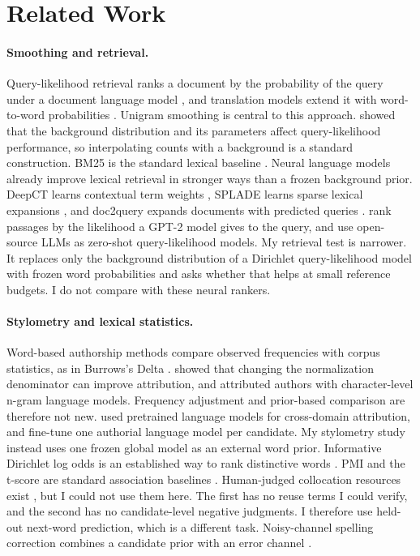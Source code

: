 \documentclass[11pt]{article}
\begin{document}
\section{Related Work}

\paragraph{Smoothing and retrieval.} Query-likelihood retrieval ranks a
document by the probability of the query under a document language model
\citep{pontecroft1998}, and translation models extend it with word-to-word
probabilities \citep{bergerlafferty1999}. Unigram smoothing is central to this
approach. \citet{zhai2004smoothing} showed that the background
distribution and its parameters affect query-likelihood performance, so
interpolating counts with a background is a standard construction. BM25 is the
standard lexical baseline \citep{robertson2009bm25}. Neural language models
already improve lexical retrieval in stronger ways than a frozen background
prior. DeepCT learns contextual term weights \citep{daicallan2020deepct},
SPLADE learns sparse lexical expansions \citep{formal2021splade}, and
doc2query expands documents with predicted queries
\citep{nogueira2019doc2query}. \citet{dossantos2020beyond} rank passages by the
likelihood a GPT-2 model gives to the query, and \citet{zhuang2023} use
open-source LLMs as zero-shot query-likelihood models. My retrieval test is narrower.
It replaces only the background distribution of a Dirichlet query-likelihood
model with frozen word probabilities and asks whether that helps at small
reference budgets. I do not compare with these neural rankers.

\paragraph{Stylometry and lexical statistics.} Word-based authorship methods
compare observed frequencies with corpus statistics, as in Burrows's Delta
\citep{hoover2004testing}. \citet{eder2022boosting} showed that changing the
normalization denominator can improve attribution, and
\citet{peng2003authorship} attributed authors with character-level n-gram
language models. Frequency adjustment and
prior-based comparison are therefore not new. \citet{barlas2020crossdomain} used pretrained language models for
cross-domain attribution, and \citet{huang2025perplexity}
fine-tune one authorial language model per candidate. My stylometry study
instead uses one frozen global model as an external word prior. Informative
Dirichlet log odds is an established way to rank distinctive words
\citep{monroe2008fightin}. PMI and the t-score are standard association
baselines \citep{bouma2010collocation}. Human-judged collocation resources
exist \citep{kilgarriff2014collocation,collocaid2021}, but I could not use them
here. The first has no reuse terms I could verify, and the second has no
candidate-level negative judgments. I therefore use held-out next-word
prediction, which is a different task. Noisy-channel spelling correction
combines a candidate prior with an error channel \citep{brillmoore2000}.
\end{document}
